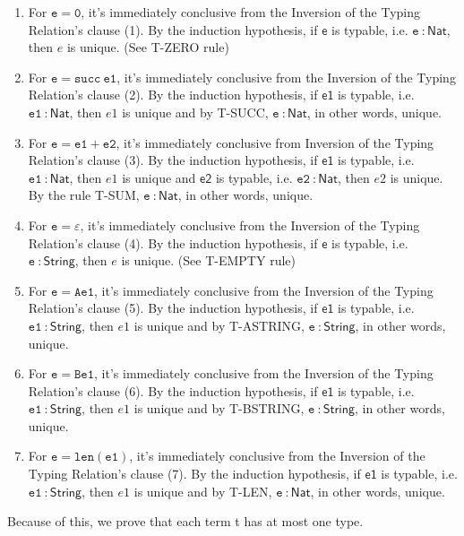 \documentclass[a4paper]{article}
\begin{document}
\begin{enumerate}
  \item For $\mathtt {e = 0}$, it's immediately conclusive from the Inversion of the Typing Relation's clause (1). By the induction hypothesis, if $\mathsf{e}$ is typable, i.e. $\mathtt {e}~\mathsf{ : Nat}$, then $e$ is unique. (See T-ZERO rule)
  \item For $\mathtt {e = succ \ e1}$, it's immediately conclusive from the Inversion of the Typing Relation's clause (2). By the induction hypothesis, if $\mathsf{e1}$ is typable, i.e. $\mathtt {e1}~\mathsf{ : Nat}$, then $e1$ is unique and by T-SUCC, $\mathtt {e}~\mathsf{ : Nat}$, in other words, unique.
   \item For $\mathtt {e = e1 + e2}$, it's immediately conclusive from Inversion of the Typing Relation's clause (3). By the induction hypothesis, if $\mathsf{e1}$ is typable, i.e. $\mathtt {e1}~\mathsf{ : Nat}$, then $e1$ is unique and $\mathsf{e2}$ is typable, i.e. $\mathtt {e2}~\mathsf{ : Nat}$, then $e2$ is unique. By the rule T-SUM, $\mathtt {e}~\mathsf{ : Nat}$, in other words, unique.
   \item For $\mathtt {e = \varepsilon}$, it's immediately conclusive from the Inversion of the Typing Relation's clause (4). By the induction hypothesis, if $\mathsf{e}$ is typable, i.e. $\mathtt {e}~\mathsf{ : String}$, then $e$ is unique. (See T-EMPTY rule)
   \item For $\mathtt {e = Ae1}$, it's immediately conclusive from the Inversion of the Typing Relation's clause (5). By the induction hypothesis, if $\mathsf{e1}$ is typable, i.e. $\mathtt {e1}~\mathsf{ : String}$, then $e1$ is unique and by T-ASTRING, $\mathtt {e}~\mathsf{ : String}$, in other words, unique.
   \item For $\mathtt {e = Be1}$, it's immediately conclusive from the Inversion of the Typing Relation's clause (6). By the induction hypothesis, if $\mathsf{e1}$ is typable, i.e. $\mathtt {e1}~\mathsf{ : String}$, then $e1$ is unique and by T-BSTRING, $\mathtt {e}~\mathsf{ : String}$, in other words, unique.
   \item For $\mathtt {e = len(e1)}$, it's immediately conclusive from the Inversion of the Typing Relation's clause (7). By the induction hypothesis, if $\mathsf{e1}$ is typable, i.e. $\mathtt {e1}~\mathsf{ : String}$, then $e1$ is unique and by T-LEN, $\mathtt {e}~\mathsf{ : Nat}$, in other words, unique.
\end{enumerate}
Because of this, we prove that each term t has at most one type.
\end{document}
